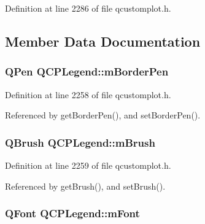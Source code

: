 Definition at line 2286 of file qcustomplot.\+h.



\subsection{Member Data Documentation}
\hypertarget{class_q_c_p_legend_a52ab8342a382456131d567f962d7f9d0}{}
\subsubsection[{m\+Border\+Pen}]{\setlength{\rightskip}{0pt plus 5cm}Q\+Pen Q\+C\+P\+Legend\+::m\+Border\+Pen\hspace{0.3cm}{\ttfamily [protected]}}\label{class_q_c_p_legend_a52ab8342a382456131d567f962d7f9d0}


Definition at line 2258 of file qcustomplot.\+h.



Referenced by get\+Border\+Pen(), and set\+Border\+Pen().

\hypertarget{class_q_c_p_legend_a9bd7cd05a9a485e06eda513a348baf80}{}
\subsubsection[{m\+Brush}]{\setlength{\rightskip}{0pt plus 5cm}Q\+Brush Q\+C\+P\+Legend\+::m\+Brush\hspace{0.3cm}{\ttfamily [protected]}}\label{class_q_c_p_legend_a9bd7cd05a9a485e06eda513a348baf80}


Definition at line 2259 of file qcustomplot.\+h.



Referenced by get\+Brush(), and set\+Brush().

\hypertarget{class_q_c_p_legend_a56ffacb184a99eefe09a0c7181d0713d}{}
\subsubsection[{m\+Font}]{\setlength{\rightskip}{0pt plus 5cm}Q\+Font Q\+C\+P\+Legend\+::m\+Font\hspace{0.3cm}{\ttfamily [protected]}}\label{class_q_c_p_legend_a56ffacb184a99eefe09a0c7181d0713d}


